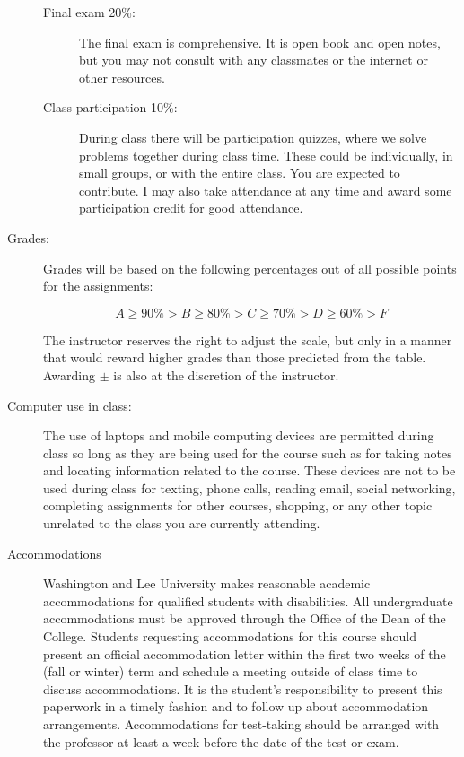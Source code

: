 \documentclass[12pt]{article}
\begin{document}
\begin{description}
\begin{description}
\item[Final exam 20\%:]  The final exam is comprehensive.  It is open
book and open notes, but you may not consult with any classmates
or the internet or other resources.

\item[Class participation 10\%:] During class there will be 
participation quizzes, where we solve problems together
during class time.  These could be individually, in small
groups, or with the entire class.  You are expected to contribute.
I may also take attendance
at any time and award some participation credit for
good attendance. 

\end{description}

\item[Grades:] Grades will be based on the following percentages
out of all possible points for the assignments:

\[
A \geq 90\% > B \geq 80\% > C \geq 70\% > D \geq 60\% > F
\]

The instructor reserves the right to adjust the scale,
but only in a manner that would reward higher grades than
those predicted from the table. Awarding $\pm$ is also at
the discretion of the instructor.


\item[Computer use in class:]
The use of laptops and mobile computing devices are 
permitted during class so long as they are being used 
for the course such as for taking notes and locating
information related to the course. These devices are
not to be used during class for texting, phone calls, 
reading email, social networking, completing assignments
for other courses, shopping, or any other topic unrelated
to the class you are currently attending.

\item[Accommodations]
Washington and Lee University makes reasonable academic 
accommodations for qualified students with disabilities. 
All undergraduate accommodations must be approved through 
the Office of the Dean of the College. Students requesting 
accommodations for this course should present an official 
accommodation letter within the first two weeks of the 
(fall or winter) term and schedule a meeting outside of 
class time to discuss accommodations. It is the student’s 
responsibility to present this paperwork in a timely 
fashion and to follow up about accommodation arrangements. 
Accommodations for test-taking should be arranged with the 
professor at least a week before the date of the test or exam.


\end{description}
\end{document}
